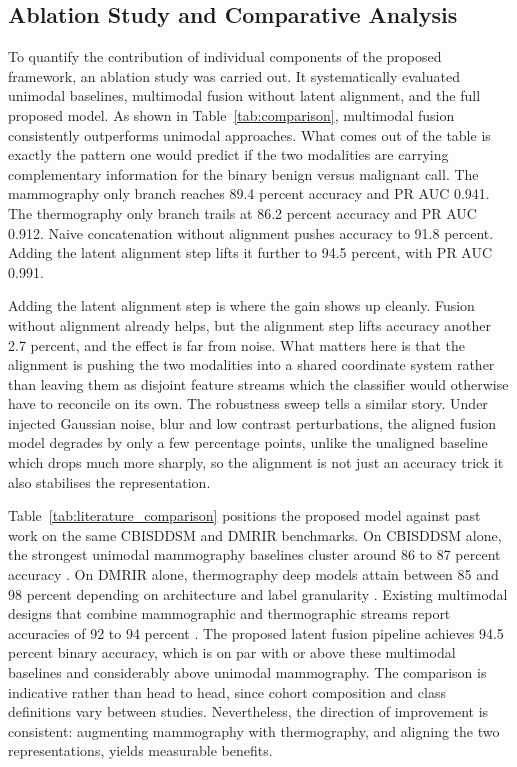 \documentclass[lettersize,journal]{IEEEtran}
\begin{document}
\subsection{Ablation Study and Comparative Analysis}

To quantify the contribution of individual components of the proposed framework, an ablation study was carried out. It systematically evaluated unimodal baselines, multimodal fusion without latent alignment, and the full proposed model. As shown in Table~\ref{tab:comparison}, multimodal fusion consistently outperforms unimodal approaches. What comes out of the table is exactly the pattern one would predict if the two modalities are carrying complementary information for the binary benign versus malignant call. The mammography only branch reaches 89.4 percent accuracy and PR AUC 0.941. The thermography only branch trails at 86.2 percent accuracy and PR AUC 0.912. Naive concatenation without alignment pushes accuracy to 91.8 percent. Adding the latent alignment step lifts it further to 94.5 percent, with PR AUC 0.991.

Adding the latent alignment step is where the gain shows up cleanly. Fusion without alignment already helps, but the alignment step lifts accuracy another 2.7 percent, and the effect is far from noise. What matters here is that the alignment is pushing the two modalities into a shared coordinate system rather than leaving them as disjoint feature streams which the classifier would otherwise have to reconcile on its own. The robustness sweep tells a similar story. Under injected Gaussian noise, blur and low contrast perturbations, the aligned fusion model degrades by only a few percentage points, unlike the unaligned baseline which drops much more sharply, so the alignment is not just an accuracy trick it also stabilises the representation.

Table~\ref{tab:literature_comparison} positions the proposed model against past work on the same CBIS\textendash DDSM and DMR\textendash IR benchmarks. On CBIS\textendash DDSM alone, the strongest unimodal mammography baselines cluster around 86 to 87 percent accuracy \cite{Shen2019DeepLearningMammo, Ragab2019CBISDDSM}. On DMR\textendash IR alone, thermography deep models attain between 85 and 98 percent depending on architecture and label granularity \cite{Jalloul2024, Alzahrani2025, Roslidar2020}. Existing multimodal designs that combine mammographic and thermographic streams report accuracies of 92 to 94 percent \cite{mostafa2022multi, khan2023hybrid}. The proposed latent fusion pipeline achieves 94.5 percent binary accuracy, which is on par with or above these multimodal baselines and considerably above unimodal mammography. The comparison is indicative rather than head to head, since cohort composition and class definitions vary between studies. Nevertheless, the direction of improvement is consistent: augmenting mammography with thermography, and aligning the two representations, yields measurable benefits.
\end{document}
